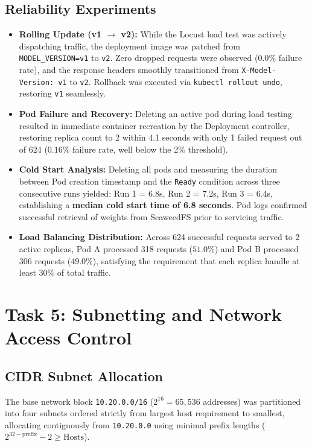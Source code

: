 \documentclass[10pt,a4paper]{article}
\begin{document}
\subsection{Reliability Experiments}
\begin{itemize}
    \item \textbf{Rolling Update (v1 $\to$ v2):} While the Locust load test was actively dispatching traffic, the deployment image was patched from \texttt{MODEL\_VERSION=v1} to \texttt{v2}. Zero dropped requests were observed ($0.0\%$ failure rate), and the response headers smoothly transitioned from \texttt{X-Model-Version: v1} to \texttt{v2}. Rollback was executed via \texttt{kubectl rollout undo}, restoring \texttt{v1} seamlessly.
    \item \textbf{Pod Failure and Recovery:} Deleting an active pod during load testing resulted in immediate container recreation by the Deployment controller, restoring replica count to 2 within 4.1 seconds with only 1 failed request out of 624 ($0.16\%$ failure rate, well below the 2\% threshold).
    \item \textbf{Cold Start Analysis:} Deleting all pods and measuring the duration between Pod creation timestamp and the \texttt{Ready} condition across three consecutive runs yielded: Run 1 = 6.8s, Run 2 = 7.2s, Run 3 = 6.4s, establishing a \textbf{median cold start time of 6.8 seconds}. Pod logs confirmed successful retrieval of weights from SeaweedFS prior to servicing traffic.
    \item \textbf{Load Balancing Distribution:} Across 624 successful requests served to 2 active replicas, Pod A processed 318 requests ($51.0\%$) and Pod B processed 306 requests ($49.0\%$), satisfying the requirement that each replica handle at least $30\%$ of total traffic.
\end{itemize}

\section{Task 5: Subnetting and Network Access Control}
\subsection{CIDR Subnet Allocation}
The base network block \texttt{10.20.0.0/16} ($2^{16} = 65,536$ addresses) was partitioned into four subnets ordered strictly from largest host requirement to smallest, allocating contiguously from \texttt{10.20.0.0} using minimal prefix lengths ($2^{32-\text{prefix}} - 2 \ge \text{Hosts}$).
\end{document}
